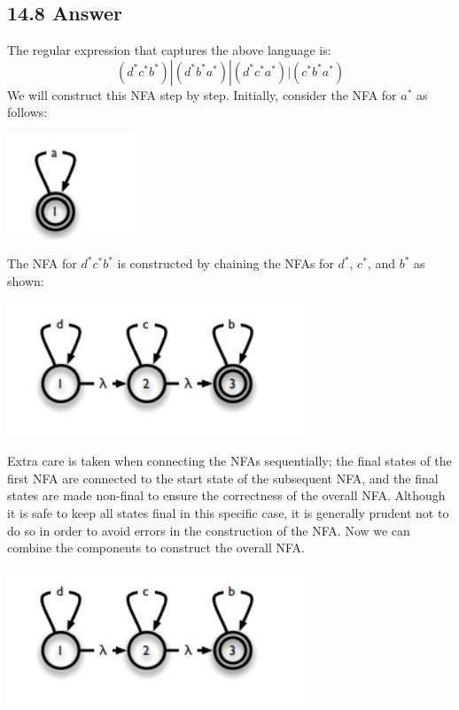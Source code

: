 \documentclass{article}
\begin{document}
\subsection*{14.8 Answer}
The regular expression that captures the above language is:
\[(d^*c^*b^*)|(d^*b^*a^*)|(d^*c^*a^*)|(c^*b^*a^*)\]
We will construct this NFA step by step. Initially, consider the NFA for \( a^* \) as follows:
\begin{center}
    \includegraphics[width=4cm]{10.png}
\end{center}
The NFA for \( d^*c^*b^* \) is constructed by chaining the NFAs for \( d^* \), \( c^* \), and \( b^* \) as shown:
\begin{center}
    \includegraphics[width=9cm]{11.png}
\end{center}
Extra care is taken when connecting the NFAs sequentially; the final states of the first NFA are connected to the start state of the subsequent NFA, and the final states are made non-final to ensure the correctness of the overall NFA. Although it is safe to keep all states final in this specific case, it is generally prudent not to do so in order to avoid errors in the construction of the NFA.
Now we can combine the components to construct the overall NFA.
\begin{center}
    \includegraphics[width=9cm]{11.png}
\end{center}
\newpage
\end{document}
